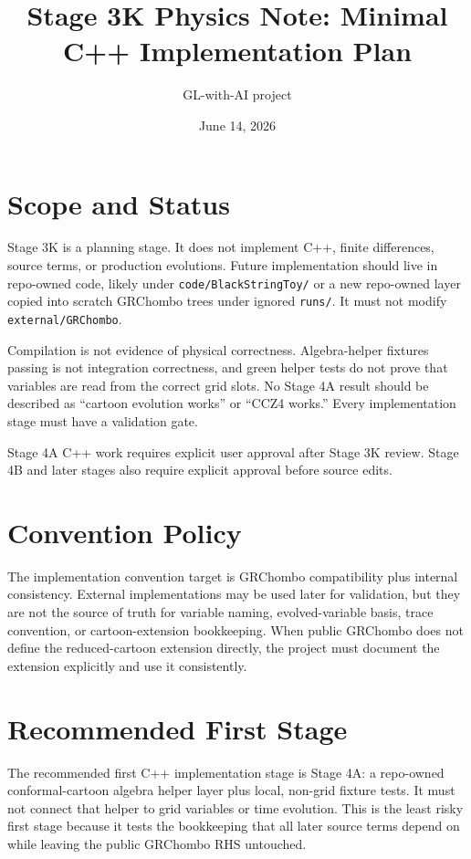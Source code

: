 \documentclass[11pt]{article}
\title{Stage 3K Physics Note: Minimal C++ Implementation Plan}
\author{GL-with-AI project}
\date{June 14, 2026}
\begin{document}
\maketitle

\section{Scope and Status}

Stage 3K is a planning stage. It does not implement C++, finite differences,
source terms, or production evolutions. Future implementation should live in
repo-owned code, likely under \texttt{code/BlackStringToy/} or a new
repo-owned layer copied into scratch GRChombo trees under ignored
\texttt{runs/}. It must not modify \texttt{external/GRChombo}.

Compilation is not evidence of physical correctness. Algebra-helper fixtures
passing is not integration correctness, and green helper tests do not prove
that variables are read from the correct grid slots. No Stage 4A result should
be described as ``cartoon evolution works'' or ``CCZ4 works.'' Every
implementation stage must have a validation gate.

Stage 4A C++ work requires explicit user approval after Stage 3K review.
Stage 4B and later stages also require explicit approval before source edits.

\section{Convention Policy}

The implementation convention target is GRChombo compatibility plus internal
consistency. External implementations may be used later for validation, but
they are not the source of truth for variable naming, evolved-variable basis,
trace convention, or cartoon-extension bookkeeping. When public GRChombo does
not define the reduced-cartoon extension directly, the project must document
the extension explicitly and use it consistently.

\section{Recommended First Stage}

The recommended first C++ implementation stage is Stage 4A: a repo-owned conformal-cartoon algebra
helper layer plus local, non-grid fixture tests. It must not connect that
helper to grid variables or time evolution. This is the least risky first stage
because it tests the bookkeeping that all later source terms depend on while
leaving the public GRChombo RHS untouched.
\end{document}
